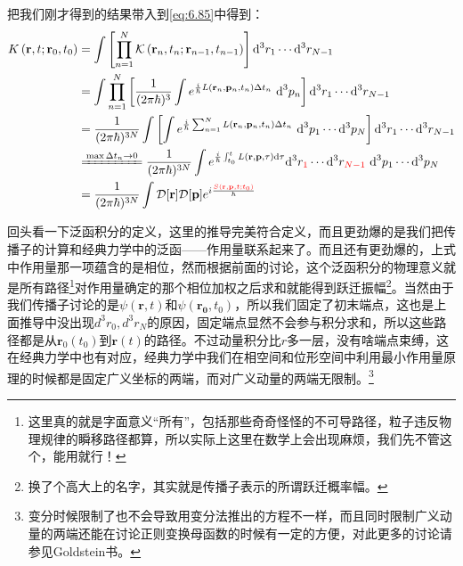 \documentclass[a4paper,zihao=-4,linespread=1]{ctexrep}
\begin{document}
	把我们刚才得到的结果带入到\ref{eq:6.85}中得到：
	\begin{equation}
		\label{eq:6.87}
		\begin{aligned}
			K\left(\mathbf{r}, t ; \mathbf{r}_{0}, t_{0}\right) & = \int\left[\prod_{n = 1}^{N} \mathcal{K}\left(\mathbf{r}_{n}, t_{n} ; \mathbf{r}_{n-1}, t_{n-1}\right)\right] \mathrm{d} ^3{r}_{1} \cdots \mathrm{d}^3{r}_{N-1} \\
			& = \int \prod_{n = 1}^{N}\left[\frac{1}{(2 \pi \hbar)^{3}} \int e^{\frac{i}{\hbar} L\left(\mathbf{r}_{n}, \mathbf{p}_{n}, t_{n}\right) \Delta t_{n}} \mathrm{~d} ^3{p}_{n}\right]  \mathrm{d} ^3{r}_{1} \cdots \mathrm{d}^3{r}_{N-1} \\
			& = \frac{1}{(2 \pi \hbar)^{3 N}} \int\left[\int e^{\frac{i}{\hbar} \sum_{n = 1}^{N} L\left(\mathbf{r}_{n}, \mathbf{p}_{n}, t_{n}\right) \Delta t_{n}} \mathrm{~d} ^3{p}_{1} \cdots \mathrm{d} ^3{p}_{N}\right]  \mathrm{d} ^3{r}_{1} \cdots \mathrm{d}^3{r}_{N-1} \\
			& \xlongequal{\max\Delta t_n\to0} \frac{1}{(2 \pi \hbar)^{3 N}} \int e^{\frac{i}{\hbar} \int_{t_0}^t L(\mathbf{r}, \mathbf{p}, \tau) \mathrm{d} \tau} \mathrm{d} ^3{r}_{{\color{red} 1}} \cdots \mathrm{d}^3{r}_{{\color{red} N-1}} \mathrm{~d} ^3{p}_{1} \cdots \mathrm{d} ^3{p}_{N} \\
			& = \frac{1}{(2 \pi \hbar)^{3 N}} \int \mathcal{D} [\mathbf{r}] \mathcal{D} [\mathbf{p}]e^{i \frac{{\color{red}S\left(\mathbf{r},\mathbf{p}, t;t_0\right)}}{\hbar}}
		\end{aligned}
	\end{equation}
	
	回头看一下泛函积分的定义，这里的推导完美符合定义，而且更劲爆的是我们把传播子的计算和经典力学中的泛函——作用量联系起来了。而且还有更劲爆的，上式中作用量那一项蕴含的是相位，然而根据前面的讨论，这个泛函积分的物理意义就是所有路径\footnote{这里真的就是字面意义“所有”，包括那些奇奇怪怪的不可导路径，粒子违反物理规律的瞬移路径都算，所以实际上这里在数学上会出现麻烦，我们先不管这个，能用就行！}对作用量确定的那个相位加权之后求和就能得到跃迁振幅\footnote{换了个高大上的名字，其实就是传播子表示的所谓跃迁概率幅。}。当然由于我们传播子讨论的是$\psi(\mathbf{r},t)$和$\psi(\mathbf{r_0},t_0)$，所以我们固定了初末端点，这也是上面推导中没出现$d^3r_0,d^3r_N$的原因，固定端点显然不会参与积分求和，所以这些路径都是从$\mathbf{r}_0(t_0)$到$\mathbf{r}(t)$的路径。不过动量积分比$r$多一层，没有啥端点束缚，这在经典力学中也有对应，经典力学中我们在相空间和位形空间中利用最小作用量原理的时候都是固定广义坐标的两端，而对广义动量的两端无限制。\footnote{变分时候限制了也不会导致用变分法推出的方程不一样，而且同时限制广义动量的两端还能在讨论正则变换母函数的时候有一定的方便，对此更多的讨论请参见Goldstein书。}
	
\end{document}
